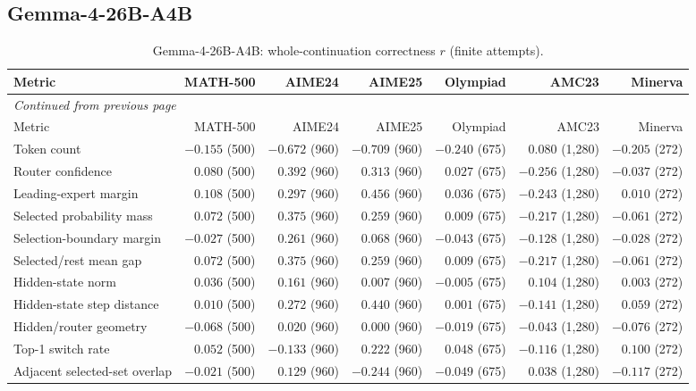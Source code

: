 \subsection{Gemma-4-26B-A4B}
\begingroup\scriptsize\setlength{\tabcolsep}{4pt}
\begin{longtable}{@{}lrrrrrr@{}}
\caption{Gemma-4-26B-A4B: whole-continuation correctness $r$ (finite attempts).}\label{tab:multi-summary-gemma}\\
\toprule
Metric & MATH-500 & AIME24 & AIME25 & Olympiad & AMC23 & Minerva \\
\midrule\endfirsthead
\multicolumn{7}{l}{\textit{Continued from previous page}}\\
\toprule
Metric & MATH-500 & AIME24 & AIME25 & Olympiad & AMC23 & Minerva \\
\midrule\endhead
\bottomrule\endfoot
Token count & $-0.155$ (500) & $-0.672$ (960) & $-0.709$ (960) & $-0.240$ (675) & $0.080$ (1,280) & $-0.205$ (272) \\
Router confidence & $0.080$ (500) & $0.392$ (960) & $0.313$ (960) & $0.027$ (675) & $-0.256$ (1,280) & $-0.037$ (272) \\
Leading-expert margin & $0.108$ (500) & $0.297$ (960) & $0.456$ (960) & $0.036$ (675) & $-0.243$ (1,280) & $0.010$ (272) \\
Selected probability mass & $0.072$ (500) & $0.375$ (960) & $0.259$ (960) & $0.009$ (675) & $-0.217$ (1,280) & $-0.061$ (272) \\
Selection-boundary margin & $-0.027$ (500) & $0.261$ (960) & $0.068$ (960) & $-0.043$ (675) & $-0.128$ (1,280) & $-0.028$ (272) \\
Selected/rest mean gap & $0.072$ (500) & $0.375$ (960) & $0.259$ (960) & $0.009$ (675) & $-0.217$ (1,280) & $-0.061$ (272) \\
Hidden-state norm & $0.036$ (500) & $0.161$ (960) & $0.007$ (960) & $-0.005$ (675) & $0.104$ (1,280) & $0.003$ (272) \\
Hidden-state step distance & $0.010$ (500) & $0.272$ (960) & $0.440$ (960) & $0.001$ (675) & $-0.141$ (1,280) & $0.059$ (272) \\
Hidden/router geometry & $-0.068$ (500) & $0.020$ (960) & $0.000$ (960) & $-0.019$ (675) & $-0.043$ (1,280) & $-0.076$ (272) \\
Top-1 switch rate & $0.052$ (500) & $-0.133$ (960) & $0.222$ (960) & $0.048$ (675) & $-0.116$ (1,280) & $0.100$ (272) \\
Adjacent selected-set overlap & $-0.021$ (500) & $0.129$ (960) & $-0.244$ (960) & $-0.049$ (675) & $0.038$ (1,280) & $-0.117$ (272) \\
\end{longtable}\endgroup

